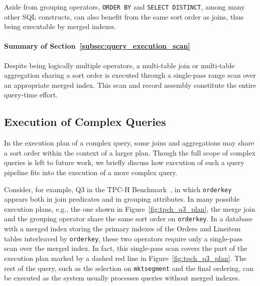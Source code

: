 \documentclass[sigconf, pdfa, nonacm]{acmart}
\newcommand\summary[1]{\paragraph{\textbf{#1}}}
\begin{document}
Aside from grouping operators, \texttt{ORDER BY} and \texttt{SELECT DISTINCT}, among many other SQL constructs, can also benefit from the same sort order as joins, thus being executable by merged indexes.

\summary{Summary of Section~\ref{subsec:query_execution_scan}}\label{sssec:summary_query_execution_scan}

Despite being logically multiple operators, a multi-table join or multi-table aggregation sharing a sort order is executed through a single-pass range scan over an appropriate merged index. This scan and record assembly constitute the entire query-time effort.

\subsection{Execution of Complex Queries}\label{subsec:complex_queries}

In the execution plan of a complex query, some joins and aggregations may share a sort order within the context of a larger plan.
Though the full scope of complex queries is left to future work, we briefly discuss how execution of such a query pipeline fits into the execution of a more complex query.

Consider, for example, Q3 in the TPC-H Benchmark~\cite{tpch2017spec}, in which \texttt{orderkey} appears both in join predicates and in grouping attributes.
In many possible execution plans, e.g., the one shown in Figure~\ref{fig:tpch_q3_plan}, the merge join and the grouping operator share the same sort order on \texttt{orderkey}.
In a database with a merged index storing the primary indexes of the Orders and Lineitem tables interleaved by \texttt{orderkey},
these two operators require only a single-pass scan over the merged index.
In fact, this single-pass scan covers the part of the execution plan marked by a dashed red line in Figure~\ref{fig:tpch_q3_plan}.
The rest of the query, such as the selection on \texttt{mktsegment} and the final ordering, can be executed as the system usually processes queries without merged indexes.
\end{document}

